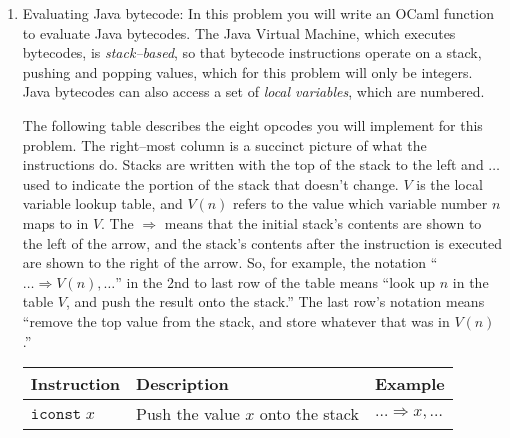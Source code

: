 \documentclass[11pt]{article}
\begin{document}
\begin{enumerate}
          \pagebreak


    \item Evaluating Java bytecode: In this problem you will
          write an OCaml function to evaluate Java bytecodes.  The Java
          Virtual Machine, which executes bytecodes, is \emph{stack--based},
          so that bytecode instructions operate on a stack, pushing and
          popping values, which for this problem will only be integers.
          Java bytecodes can also access a set of \emph{local variables},
          which are numbered.

      The following table describes the eight opcodes you will implement for
      this problem.  The right--most column is a succinct picture of what
      the instructions do.  Stacks are written with the top of the stack to
      the left and $\ldots$ used to indicate the portion of the stack that
      doesn't change.  $V$ is the local variable lookup table, and $V(n)$
      refers to the value which variable number $n$ maps to in $V$.  The
      $\Rightarrow$ means that the initial stack's contents are shown to the
      left of the arrow, and the stack's contents after the instruction is
      executed are shown to the right of the arrow.  So, for example, the
      notation ``$\ldots \Rightarrow V(n), \ldots$'' in the 2nd to last row
      of the table means ``look up $n$ in the table $V$, and push the result
      onto the stack.''  The last row's notation means ``remove the top
      value from the stack, and store whatever that was in $V(n)$.''

      \vspace{-1mm}

      \newcommand{\iload}[1]{\texttt{iload}\;#1}
      \newcommand{\istore}[1]{\texttt{istore}\;#1}
      \newcommand{\dup}{\texttt{dup}}
      \newcommand{\iadd}{\texttt{iadd}}
      \newcommand{\iconst}[1]{\texttt{iconst}\;#1}
      \newcommand{\nop}{\texttt{nop}}
      \newcommand{\pop}{\texttt{pop}}
      \newcommand{\swap}{\texttt{swap}}

      \begin{center}
        \begin{tabular}{|l|p{3.2in}|l|} \hline
          Instruction &
          Description &
          Example \\ \hline \hline
          $\iconst{x}$ &
          Push the value $x$ onto the stack  &
          $\ldots \Rightarrow x, \ldots$ \\ \hline


\end{tabular}
\end{center}
\end{enumerate}
\end{document}
